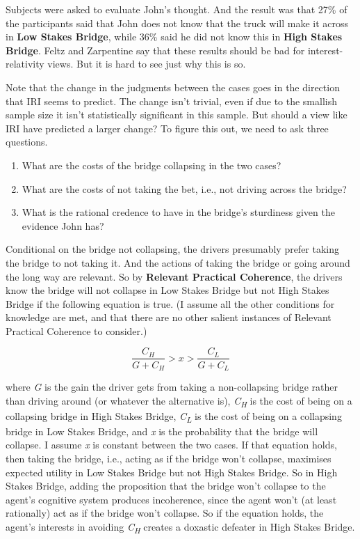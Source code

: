 \documentclass[
  10pt,
  letterpaper,
  DIV=11,
  numbers=noendperiod,
  twoside]{scrartcl}
\providecommand{\tightlist}{%
  \setlength{\itemsep}{0pt}\setlength{\parskip}{0pt}}\usepackage{longtable,booktabs,array}
\begin{document}
Subjects were asked to evaluate John's thought. And the result was that
27\% of the participants said that John does not know that the truck
will make it across in \textbf{Low Stakes Bridge}, while 36\% said he
did not know this in \textbf{High Stakes Bridge}. Feltz and Zarpentine
say that these results should be bad for interest-relativity views. But
it is hard to see just why this is so.

Note that the change in the judgments between the cases goes in the
direction that IRI seems to predict. The change isn't trivial, even if
due to the smallish sample size it isn't statistically significant in
this sample. But should a view like IRI have predicted a larger change?
To figure this out, we need to ask three questions.

\begin{enumerate}
\def\labelenumi{\arabic{enumi}.}
\tightlist
\item
  What are the costs of the bridge collapsing in the two cases?
\item
  What are the costs of not taking the bet, i.e., not driving across the
  bridge?
\item
  What is the rational credence to have in the bridge's sturdiness given
  the evidence John has?
\end{enumerate}

Conditional on the bridge not collapsing, the drivers presumably prefer
taking the bridge to not taking it. And the actions of taking the bridge
or going around the long way are relevant. So by \textbf{Relevant
Practical Coherence}, the drivers know the bridge will not collapse in
Low Stakes Bridge but not High Stakes Bridge if the following equation
is true. (I assume all the other conditions for knowledge are met, and
that there are no other salient instances of Relevant Practical
Coherence to consider.)

\[
\frac{C_H}{G + C_H} > x > \frac{C_L}{G + C_L}
\]

where \emph{G} is the gain the driver gets from taking a non-collapsing
bridge rather than driving around (or whatever the alternative is),
\emph{C\textsubscript{H}} is the cost of being on a collapsing bridge in
High Stakes Bridge, \emph{C\textsubscript{L}} is the cost of being on a
collapsing bridge in Low Stakes Bridge, and \emph{x} is the probability
that the bridge will collapse. I assume \emph{x} is constant between the
two cases. If that equation holds, then taking the bridge, i.e., acting
as if the bridge won't collapse, maximises expected utility in Low
Stakes Bridge but not High Stakes Bridge. So in High Stakes Bridge,
adding the proposition that the bridge won't collapse to the agent's
cognitive system produces incoherence, since the agent won't (at least
rationally) act as if the bridge won't collapse. So if the equation
holds, the agent's interests in avoiding \emph{C\textsubscript{H}}
creates a doxastic defeater in High Stakes Bridge.
\end{document}
